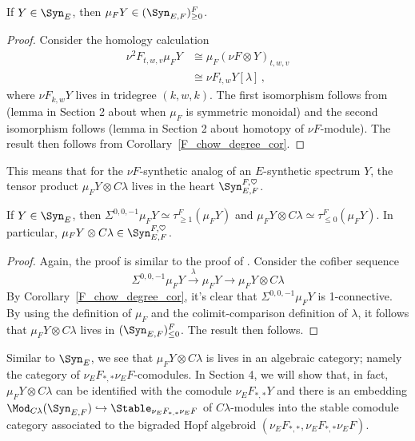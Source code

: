   \begin{corollary}
      If $Y\in\Syn_E$, then $\mu_FY\in (\Syn_{E,F})_{\geq 0}^F$.
  \end{corollary}
  
  \begin{proof}
      Consider the homology calculation
  \begin{equation*}
      \begin{aligned}
          \nu^2F_{t,w,v}\mu_FY &\cong \mu_F(\nu F\otimes Y)_{t,w,v} \\
          &\cong \nu F_{t,w} Y[\lambda]\, ,
      \end{aligned}
  \end{equation*}
  where $\nu F_{k,w} Y$ lives in tridegree $(k,w,k)$. The first isomorphism follows from (lemma in Section 2 about when $\mu_F$ is symmetric monoidal) and the second isomorphism follows (lemma in Section 2 about homotopy of $\nu F$-module). The result then follows from Corollary~\ref{F_chow_degree_cor}.
  \end{proof}
  
  This means that for the $\nu F$-synthetic analog of an $E$-synthetic spectrum $Y$, the tensor product $\mu_FY\otimes C\lambda$ lives in the heart $\Syn_{E,F}^{F,\heartsuit}$.
  
  \begin{corollary}
  If $Y\in\Syn_E$, then $\Sigma^{0,0,-1}\mu_FY\simeq \tau_{\geq 1}^F(\mu_FY)$ and $\mu_F Y\otimes C\lambda\simeq \tau_{\leq 0}^F(\mu_FY)$. In particular, $\mu_FY\otimes C\lambda\in \Syn_{E,F}^{F,\heartsuit}$.  
  \end{corollary}
  
  \begin{proof}
     Again, the proof is similar to the proof of \cite[Lemma 4.29]{Pst22}. Consider the cofiber sequence
     $$
  \Sigma^{0,0,-1}\mu_FY\xrightarrow{\lambda}\mu_FY\to \mu_FY\otimes C\lambda
     $$
     By Corollary~\ref{F_chow_degree_cor}, it's clear that $\Sigma^{0,0,-1}\mu_FY$ is 1-connective. By using the definition of $\mu_F$ and the colimit-comparison definition of $\lambda$, it follows that $\mu_FY\otimes C\lambda$ lives in $(\Syn_{E,F})_{\leq 0}^F$. The result then follows.
  \end{proof}
  
  \begin{remark}
  Similar to $\Syn_E$, we see that $\mu_FY\otimes C\lambda$ is lives in an algebraic category; namely the category of $\nu_EF_{*,*}\nu_E F$-comodules. In Section 4, we will show that, in fact, $\mu_FY\otimes C\lambda$ can be identified with the comodule $\nu_{E}F_{*,*}Y$ and there is an embedding $\Mod_{C\lambda}(\Syn_{E,F})\hookrightarrow \Stable_{\nu_EF_{*,*}\nu_EF}$ of $C\lambda$-modules into the stable comodule category associated to the bigraded Hopf algebroid $(\nu_EF_{*,*},\nu_EF_{*,*}\nu_EF)$.    
  \end{remark}
  
